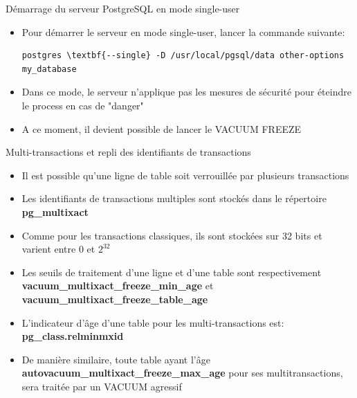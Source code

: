 
\begin{frame}[fragile]{Démarrage du serveur PostgreSQL en mode single-user}

\begin{itemize}
   \item Pour démarrer le serveur en mode single-user, lancer la commande suivante:
\begin{tiny}
\begin{Verbatim}[commandchars=\\\{\}]
   postgres \textbf{--single} -D /usr/local/pgsql/data other-options my_database
\end{Verbatim}
\end{tiny}
   \item Dans ce mode, le serveur n'applique pas les mesures de sécurité pour éteindre le process en cas de "danger"
   \item A ce moment, il devient possible de lancer le VACUUM FREEZE
\end{itemize}

\begin{toile}
\end{toile}

\end{frame}


\begin{frame}{Multi-transactions et repli des identifiants de transactions}

\begin{itemize}
   \item Il est possible qu'une ligne de table soit verrouillée par plusieurs transactions
   \item Les identifiants de transactions multiples sont stockés dans le répertoire \textbf{pg\_multixact}
   \item Comme pour les transactions classiques, ils sont stockées sur 32 bits et varient entre 0 et $2^{32}$
   \item Les seuils de traitement d'une ligne et d'une table sont respectivement \textbf{vacuum\_multixact\_freeze\_min\_age} et \textbf{vacuum\_multixact\_freeze\_table\_age}
   \item L'indicateur d'âge d'une table pour les multi-transactions est: \textbf{pg\_class.relminmxid}
   \item De manière similaire,  toute table ayant l'âge \textbf{autovacuum\_multixact\_freeze\_max\_age} pour ses multitransactions, sera traitée par un VACUUM agressif

\end{itemize}

\end{frame}

